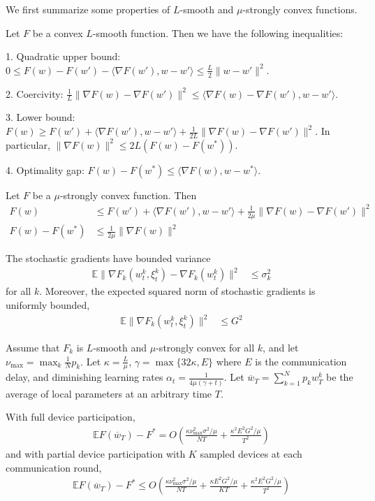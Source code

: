 We first summarize some properties of $L$-smooth and $\mu$-strongly
convex functions. 
\begin{lemma}
	Let $F$ be a convex $L$-smooth function. Then we have the following
	inequalities:
	
	1. Quadratic upper bound: $0\leq F(w)-F(w')-\langle\nabla F(w'),w-w'\rangle\leq\frac{L}{2}\|w-w'\|^{2}$. 
	
	2. Coercivity: $\frac{1}{L}\|\nabla F(w)-\nabla F(w')\|^{2}\leq\langle\nabla F(w)-\nabla F(w'),w-w'\rangle$.
	
	3. Lower bound: $F(w)\geq F(w')+\langle\nabla F(w'),w-w'\rangle+\frac{1}{2L}\|\nabla F(w)-\nabla F(w')\|^{2}$.
	In particular, $\|\nabla F(w)\|^{2}\leq2L(F(w)-F(w^{\ast}))$.
	
	4. Optimality gap: $F(w)-F(w^{\ast})\leq$$\langle\nabla F(w),w-w^{\ast}\rangle$.
\end{lemma}
%
\begin{lemma}
	Let $F$ be a $\mu$-strongly convex function. Then 
	\begin{align*}
	F(w) & \leq F(w')+\langle\nabla F(w'),w-w'\rangle+\frac{1}{2\mu}\|\nabla F(w)-\nabla F(w')\|^{2}\\
	F(w)-F(w^{\ast}) & \leq\frac{1}{2\mu}\|\nabla F(w)\|^{2}
	\end{align*}
\end{lemma}
%
\begin{assumption}
	The stochastic gradients have bounded variance 
	\begin{align*}
	\mathbb{E}\|\nabla F_{k}(w_{t}^{k},\xi_{t}^{k})-\nabla F_{k}(w_{t}^{k})\|^{2} & \leq\sigma_{k}^{2}
	\end{align*}
	for all $k$. Moreover, the expected squared norm of stochastic gradients
	is uniformly bounded, 
	\begin{align*}
	\mathbb{E}\|\nabla F_{k}(w_{t}^{k},\xi_{t}^{k})\|^{2} & \leq G^{2}
	\end{align*}
\end{assumption}

\begin{theorem}
	Assume that $F_{k}$ is $L$-smooth and $\mu$-strongly convex for
	all $k$, and let $\nu_{\max}=\max_{k}\frac{1}{N}p_{k}$. Let $\kappa=\frac{L}{\mu}$,
	$\gamma=\max\{32\kappa,E\}$ where $E$ is the communication delay,
	and diminishing learning rates $\alpha_{t}=\frac{1}{4\mu(\gamma+t)}$.
	Let $\overline{w}_{T}=\sum_{k=1}^{N}p_{k}w_{T}^{k}$ be the average
	of local parameters at an arbitrary time $T$. 
	
	With full device participation, 
	\begin{align*}
	\mathbb{E}F(\overline{w}_{T})-F^{\ast}=O(\frac{\kappa\nu_{\max}^{2}\sigma^{2}/\mu}{NT}+\frac{\kappa^{2}E^{2}G^{2}/\mu}{T^{2}})
	\end{align*}
	and with partial device participation with $K$ sampled devices at
	each communication round, 
	\begin{align*}
	\mathbb{E}F(\overline{w}_{T})-F^{\ast}\leq O(\frac{\kappa\nu_{\max}^{2}\sigma^{2}/\mu}{NT}+\frac{\kappa E^{2}G^{2}/\mu}{KT}+\frac{\kappa^{2}E^{2}G^{2}/\mu}{T^{2}})
	\end{align*}
\end{theorem}

